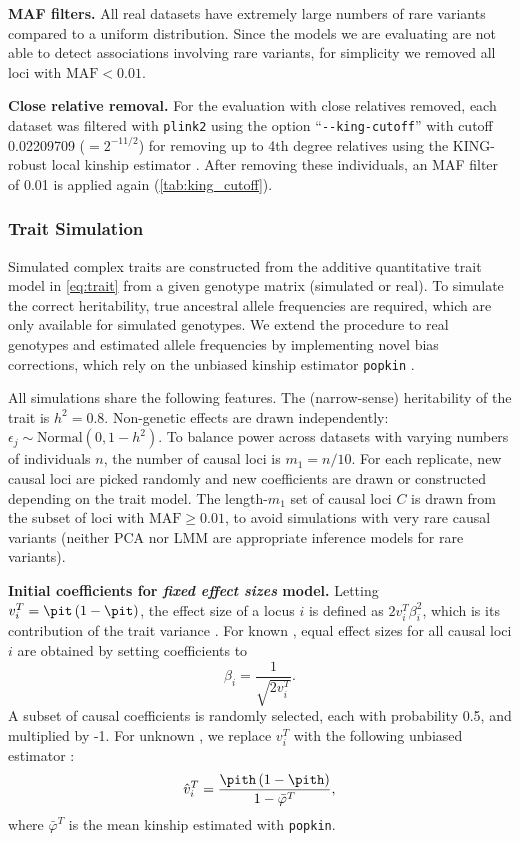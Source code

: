 \documentclass[11pt]{article}
\begin{document}
\textbf{MAF filters.}
All real datasets have extremely large numbers of rare variants compared to a uniform distribution.
Since the models we are evaluating are not able to detect associations involving rare variants, for simplicity we removed all loci with $\text{MAF} < 0.01$.

\textbf{Close relative removal.}
For the evaluation with close relatives removed, each dataset was filtered with \texttt{plink2} using the option ``\texttt{-{}-king-cutoff}'' with cutoff 0.02209709 ($= 2^{-11/2}$) for removing up to 4th degree relatives using the KING-robust local kinship estimator \citep{manichaikul_robust_2010}.
After removing these individuals, an MAF filter of 0.01 is applied again (\cref{tab:king_cutoff}).

\subsubsection{Trait Simulation}

Simulated complex traits are constructed from the additive quantitative trait model in \cref{eq:trait} from a given genotype matrix (simulated or real).
To simulate the correct heritability, true ancestral allele frequencies \pit are required, which are only available for simulated genotypes.
We extend the procedure to real genotypes and estimated allele frequencies \pith by implementing novel bias corrections, which rely on the unbiased kinship estimator \texttt{popkin} \citep{ochoa_estimating_2021}.

All simulations share the following features.
The (narrow-sense) heritability of the trait is $h^2 = 0.8$.
Non-genetic effects are drawn independently: $\epsilon_j \sim \text{Normal}(0, 1 - h^2 )$.
To balance power across datasets with varying numbers of individuals $n$, the number of causal loci is $m_1 = n / 10$.
For each replicate, new causal loci are picked randomly and new coefficients are drawn or constructed depending on the trait model.
The length-$m_1$ set of causal loci $C$ is drawn from the subset of loci with $\text{MAF} \ge 0.01$, to avoid simulations with very rare causal variants (neither PCA nor LMM are appropriate inference models for rare variants).

\textbf{Initial coefficients for \textit{fixed effect sizes} model.}
Letting $v_i^T = \pit \left( 1 - \pit \right)$, the effect size of a locus $i$ is defined as $2 v_i^T \beta_i^2$, which is its contribution of the trait variance \citep{park_estimation_2010}.
For known \pit, equal effect sizes for all causal loci $i$ are obtained by setting coefficients to
$$
\beta_i = \frac{1}{ \sqrt{ 2 v_i^T } }.
$$
A subset of causal coefficients is randomly selected, each with probability 0.5, and multiplied by -1.
For unknown \pit, we replace $v_i^T$ with the following unbiased estimator \citep{ochoa_estimating_2021}:
\begin{equation*}
  \hat{v}_i^T
  =
  \frac{ \pith \left( 1 - \pith \right) }{ 1 - \bar{\varphi}^T } 
  ,
\end{equation*}
where $\bar{\varphi}^T$ is the mean kinship estimated with \texttt{popkin}.
\end{document}
